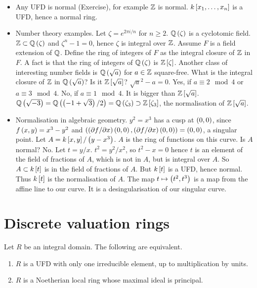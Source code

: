 \begin{example*}
\hfill
\begin{itemize}
\item Any UFD is normal (Exercise), for example $ \Z $ is normal. $ k\sb{x_1, \dots, x_n} $ is a UFD, hence a normal ring.
\item Number theory examples. Let $ \zeta = e^{2\pi i / n} $ for $ n \ge 2 $. $ \Q\rb{\zeta} $ is a cyclotomic field. $ \Z \subset \Q\rb{\zeta} $ and $ \zeta^n - 1 = 0 $, hence $ \zeta $ is integral over $ \Z $. Assume $ F $ is a field extension of $ \Q $. Define the ring of integers of $ F $ as the integral closure of $ \Z $ in $ F $. A fact is that the ring of integers of $ \Q\rb{\zeta} $ is $ \Z\sb{\zeta} $. Another class of interesting number fields is $ \Q\rb{\sqrt{a}} $ for $ a \in \Z $ square-free. What is the integral closure of $ \Z $ in $ \Q\rb{\sqrt{a}} $? Is it $ \Z\sb{\sqrt{a}} $? $ \sqrt{a}^2 - a = 0 $. Yes, if $ a \equiv 2 \mod 4 $ or $ a \equiv 3 \mod 4 $. No, if $ a \equiv 1 \mod 4 $. It is bigger than $ \Z\sb{\sqrt{a}} $. $ \Q\rb{\sqrt{-3}} = \Q\rb{\rb{-1 + \sqrt{3}} / 2} = \Q\rb{\zeta_3} \supset \Z\sb{\zeta_3} $, the normalisation of $ \Z\sb{\sqrt{a}} $.
\item Normalisation in algebraic geometry. $ y^2 = x^3 $ has a cusp at $ \rb{0, 0} $, since $ f\rb{x, y} = x^3 - y^2 $ and $ \rb{\rb{\partial f / \partial x}\rb{0, 0}, \rb{\partial f / \partial x}\rb{0, 0}} = \rb{0, 0} $, a singular point. Let $ A = k\sb{x, y} / \rb{y - x^3} $. $ A $ is the ring of functions on this curve. Is $ A $ normal? No. Let $ t = y / x $. $ t^2 = y^2 / x^2 $, so $ t^2 - x = 0 $ hence $ t $ is an element of the field of fractions of $ A $, which is not in $ A $, but is integral over $ A $. So $ A \subset k\sb{t} $ is in the field of fractions of $ A $. But $ k\sb{t} $ is a UFD, hence normal. Thus $ k\sb{t} $ is the normalisation of $ A $. The map $ t \mapsto \rb{t^2, t^3} $ is a map from the affine line to our curve. It is a desingularisation of our singular curve.
\end{itemize}
\end{example*}

\pagebreak

\section{Discrete valuation rings}


\begin{theorem}
Let $ R $ be an integral domain. The following are equivalent.
\begin{enumerate}
\item $ R $ is a UFD with only one irreducible element, up to multiplication by units.
\item $ R $ is a Noetherian local ring whose maximal ideal is principal.
\end{enumerate}
\end{theorem}

